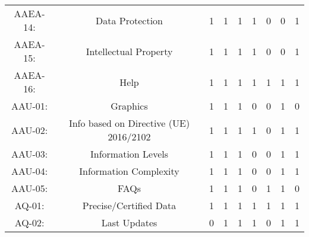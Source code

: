 \documentclass[a4paper, twoside]{report}
\begin{document}
\begin{table}[htbp]
\begin{adjustbox}{max width=\linewidth}
\begin{tabular}{rcccccccc}
    \multicolumn{1}{c}{AAEA-14:} & \multicolumn{1}{p{19em}}{Data Protection} & 1     & 1     & 1     & 1     & 0     & 0     & 1 \\
    \multicolumn{1}{c}{AAEA-15:} & \multicolumn{1}{p{19em}}{Intellectual Property} & 1     & 1     & 1     & 1     & 0     & 0     & 1 \\
    \multicolumn{1}{c}{AAEA-16:} & \multicolumn{1}{p{19em}}{Help} & 1     & 1     & 1     & 1     & 1     & 1     & 1 \\
    \midrule
    \multicolumn{1}{c}{AAU-01:} & \multicolumn{1}{p{19em}}{Graphics} & 1     & 1     & 1     & 0     & 0     & 1     & 0 \\
    \multicolumn{1}{c}{AAU-02:} & \multicolumn{1}{p{19em}}{Info based on Directive (UE) 2016/2102} & 1     & 1     & 1     & 1     & 0     & 1     & 1 \\
    \multicolumn{1}{c}{AAU-03:} & \multicolumn{1}{p{19em}}{\cellcolor[rgb]{ .749,  .749,  .749}Information Levels} & \cellcolor[rgb]{ .749,  .749,  .749}1 & \cellcolor[rgb]{ .749,  .749,  .749}1 & \cellcolor[rgb]{ .749,  .749,  .749}1 & \cellcolor[rgb]{ .749,  .749,  .749}0 & \cellcolor[rgb]{ .749,  .749,  .749}0 & \cellcolor[rgb]{ .749,  .749,  .749}1 & \cellcolor[rgb]{ .749,  .749,  .749}1 \\
    \multicolumn{1}{c}{AAU-04:} & \multicolumn{1}{p{19em}}{\cellcolor[rgb]{ .749,  .749,  .749}Information Complexity} & \cellcolor[rgb]{ .749,  .749,  .749}1 & \cellcolor[rgb]{ .749,  .749,  .749}1 & \cellcolor[rgb]{ .749,  .749,  .749}1 & \cellcolor[rgb]{ .749,  .749,  .749}0 & \cellcolor[rgb]{ .749,  .749,  .749}0 & \cellcolor[rgb]{ .749,  .749,  .749}1 & \cellcolor[rgb]{ .749,  .749,  .749}1 \\
    \multicolumn{1}{c}{AAU-05:} & \multicolumn{1}{p{19em}}{\cellcolor[rgb]{ .749,  .749,  .749}FAQs} & \cellcolor[rgb]{ .749,  .749,  .749}1 & \cellcolor[rgb]{ .749,  .749,  .749}1 & \cellcolor[rgb]{ .749,  .749,  .749}1 & \cellcolor[rgb]{ .749,  .749,  .749}0 & \cellcolor[rgb]{ .749,  .749,  .749}1 & \cellcolor[rgb]{ .749,  .749,  .749}1 & \cellcolor[rgb]{ .749,  .749,  .749}0 \\
    \midrule
    \multicolumn{1}{c}{AQ-01:} & \multicolumn{1}{p{19em}}{Precise/Certified Data} & 1     & 1     & 1     & 1     & 1     & 1     & 1 \\
    \multicolumn{1}{c}{AQ-02:} & \multicolumn{1}{p{19em}}{\cellcolor[rgb]{ .749,  .749,  .749}Last Updates} & \cellcolor[rgb]{ .749,  .749,  .749}0 & \cellcolor[rgb]{ .749,  .749,  .749}1 & \cellcolor[rgb]{ .749,  .749,  .749}1 & \cellcolor[rgb]{ .749,  .749,  .749}1 & \cellcolor[rgb]{ .749,  .749,  .749}0 & \cellcolor[rgb]{ .749,  .749,  .749}1 & \cellcolor[rgb]{ .749,  .749,  .749}1 \\

\end{tabular}
\end{adjustbox}
\end{table}
\end{document}

